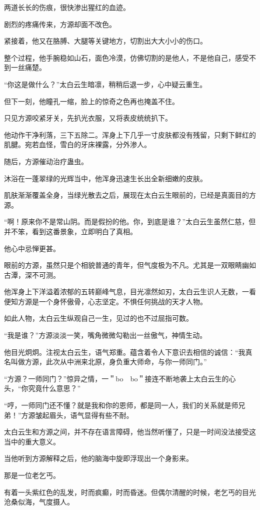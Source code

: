 \begin{this_body}
两道长长的伤痕，很快渗出猩红的血迹。

剧烈的疼痛传来，方源却面不改色。

紧接着，他又在胳膊、大腿等关键地方，切割出大大小小的伤口。

整个过程，他手腕稳如山石，面色冷漠，仿佛切割的是他人，不是他自己，感受不到一丝痛楚。

“你这是做什么？”太白云生暗凛，稍稍后退一步，心中疑云重生。

但下一刻，他瞳孔一缩，脸上的惊奇之色再也掩盖不住。

只见方源咬紧牙关，先扒光衣服，又将表皮统统扒下。

他动作干净利落，三下五除二。浑身上下几乎一寸皮肤都没有残留，只剩下鲜红的肌腱。宛若血怪，雪白的牙床裸露，分外渗人。

随后，方源催动治疗蛊虫。

沐浴在一蓬翠绿的光辉当中，他浑身迅速生长出全新细嫩的皮肤。

肌肤渐渐覆盖全身，当绿光散去之后，展现在太白云生眼前的，已经是真面目的方源。

“啊！原来你不是常山阴。而是假扮的他。你，到底是谁？”太白云生虽然仁慈，但并不笨，看到这番景象，立即明白了真相。

他心中忌惮更甚。

眼前的方源，虽然只是个相貌普通的青年，但气度极为不凡。尤其是一双眼睛幽如古潭，深不可测。

他浑身上下洋溢着浓郁的五转巅峰气息，目光凛然如刃，太白云生识人无数，一看便知方源是一个身怀傲骨，心志坚定。不惧任何挑战的天才人物。

如此人物，太白云生纵观自己一生，见过的也不过屈指可数。

“我是谁？”方源淡淡一笑，嘴角微微勾勒出一丝傲气，神情生动。

他目光炯炯。注视太白云生，语气郑重。蕴含着令人下意识去相信的诚信：“我真名叫做方源，此次从中洲来北原，身负重大师命，与你一师同门。”

“方源？一师同门？”惊异之情，一＂bo　bo＂接连不断地袭上太白云生的心头，“你究竟什么意思？”

“哼，一师同门还不懂？就是我和你的恩师，都是同一人，我们的关系就是师兄弟！”方源皱起眉头，语气显得有些不耐。

太白云生和方源之间，并不存在语言障碍，他当然听懂了，只是一时间没法接受这当中的重大意义。

当他听到方源解释之后，他的脑海中旋即浮现出一个身影来。

那是一位老乞丐。

有着一头紫红色的乱发，时而疯癫，时而昏迷。但偶尔清醒的时候，老乞丐的目光沧桑似海，气度摄人。


\end{this_body}
